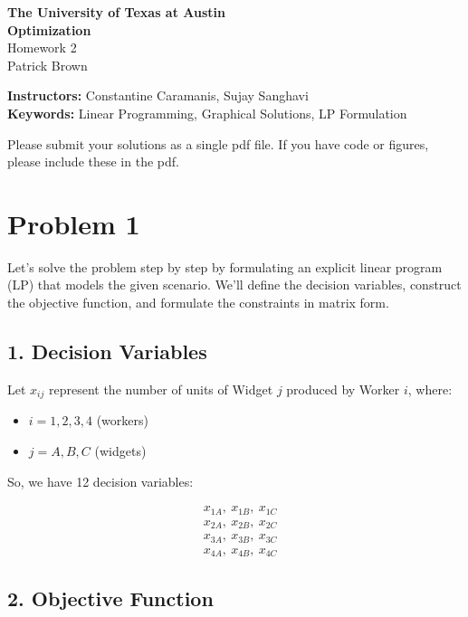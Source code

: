 \documentclass{article}
\begin{document}
\begin{center}
    \Large\textbf{The University of Texas at Austin}\\
    \Large\textbf{Optimization}\\
    \large Homework 2\\
    \normalsize Patrick Brown
\end{center}

\noindent\textbf{Instructors:} Constantine Caramanis, Sujay Sanghavi\\
\textbf{Keywords:} Linear Programming, Graphical Solutions, LP Formulation
\vspace{1cm}

\noindent Please submit your solutions as a single pdf file. If you have code or figures, please include these in the pdf.

\vspace{1cm}

\section*{Problem 1}

Let's solve the problem step by step by formulating an explicit linear program (LP) that models the given scenario. We'll define the decision variables, construct the objective function, and formulate the constraints in matrix form.

\subsection*{1. Decision Variables}

Let $x_{ij}$ represent the number of units of Widget $j$ produced by Worker $i$, where:

\begin{itemize}
    \item $i = 1, 2, 3, 4$ (workers)
    \item $j = A, B, C$ (widgets)
\end{itemize}

So, we have 12 decision variables:

\begin{align*}
    & x_{1A},\ x_{1B},\ x_{1C} \\
    & x_{2A},\ x_{2B},\ x_{2C} \\
    & x_{3A},\ x_{3B},\ x_{3C} \\
    & x_{4A},\ x_{4B},\ x_{4C}
\end{align*}

\subsection*{2. Objective Function}
\end{document}
